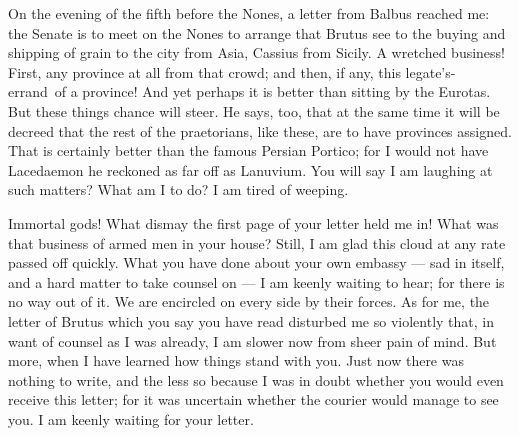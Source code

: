 

 On the evening of the fifth before the Nones, a letter from Balbus reached me: the Senate is to meet on the Nones to arrange that Brutus see to the buying and shipping of grain to the city from Asia, Cassius from Sicily. A wretched business! First, any province at all from that crowd; and then, if any, this \dag legate's-errand\dag\ of a province! And yet perhaps it is better than sitting by the Eurotas. But these things chance will steer. He says, too, that at the same time it will be decreed that the rest of the praetorians, like these, are to have provinces assigned. That is certainly better than the famous Persian Portico; for I would not have Lacedaemon \dag he reckoned as far off as Lanuvium\dag. You will say I am laughing at such matters? What am I to do? I am tired of weeping.

 Immortal gods! What dismay the first page of your letter held me in! What was that business of armed men in your house? Still, I am glad this cloud at any rate passed off quickly. What you have done about your own embassy --- sad in itself, and a hard matter to take counsel on --- I am keenly waiting to hear; for there is no way out of it. We are encircled on every side by their forces. As for me, the letter of Brutus which you say you have read disturbed me so violently that, in want of counsel as I was already, I am slower now from sheer pain of mind. But more, when I have learned how things stand with you. Just now there was nothing to write, and the less so because I was in doubt whether you would even receive this letter; for it was uncertain whether the courier would manage to see you. I am keenly waiting for your letter.
